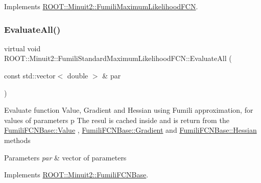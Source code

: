 Implements \mbox{\hyperlink{classROOT_1_1Minuit2_1_1FumiliMaximumLikelihoodFCN_a20aa81dc23ba61ed49ba78f4f9627e59}{R\+O\+O\+T\+::\+Minuit2\+::\+Fumili\+Maximum\+Likelihood\+F\+CN}}.

\mbox{\label{classROOT_1_1Minuit2_1_1FumiliStandardMaximumLikelihoodFCN_a37e72fc87092e5699066098fa5a31235}} 
\subsubsection{\texorpdfstring{EvaluateAll()}{EvaluateAll()}\hspace{0.1cm}{\footnotesize\ttfamily [1/2]}}
{\footnotesize\ttfamily virtual void R\+O\+O\+T\+::\+Minuit2\+::\+Fumili\+Standard\+Maximum\+Likelihood\+F\+C\+N\+::\+Evaluate\+All (\begin{DoxyParamCaption}\item[{const std\+::vector$<$ double $>$ \&}]{par }\end{DoxyParamCaption})\hspace{0.3cm}{\ttfamily [virtual]}}

Evaluate function Value, Gradient and Hessian using Fumili approximation, for values of parameters p The resul is cached inside and is return from the \mbox{\hyperlink{classROOT_1_1Minuit2_1_1FumiliFCNBase_a221dacee0ccde747a271a0cecd759f98}{Fumili\+F\+C\+N\+Base\+::\+Value}} , \mbox{\hyperlink{classROOT_1_1Minuit2_1_1FumiliFCNBase_ad226939ea2e83f754b5a6afc30876d3e}{Fumili\+F\+C\+N\+Base\+::\+Gradient}} and \mbox{\hyperlink{classROOT_1_1Minuit2_1_1FumiliFCNBase_ade134d8c6613393e942ef98d445db376}{Fumili\+F\+C\+N\+Base\+::\+Hessian}} methods


\begin{DoxyParams}{Parameters}
{\em par} & vector of parameters \\
\hline
\end{DoxyParams}


Implements \mbox{\hyperlink{classROOT_1_1Minuit2_1_1FumiliFCNBase_a0741bb4a7405cc33ab60583472a189cb}{R\+O\+O\+T\+::\+Minuit2\+::\+Fumili\+F\+C\+N\+Base}}.

\mbox{\label{classROOT_1_1Minuit2_1_1FumiliStandardMaximumLikelihoodFCN_a1faea776f7da3c238e522748b573caab}} 
